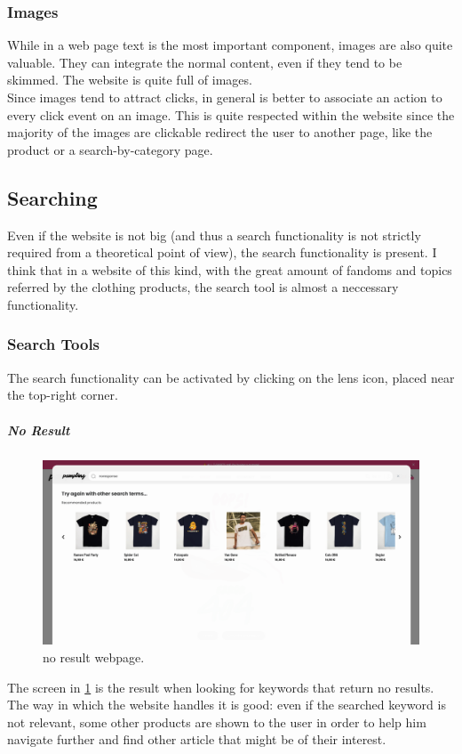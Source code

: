 \subsubsection{Images}
While in a web page text is the most important component, images are also quite valuable. 
They can integrate the normal content, even if they tend to be skimmed.
The website is quite full of images. \\
Since images tend to attract clicks, in general is better to associate an action to every click event on an image.
This is quite respected within the website since the majority of the images are clickable redirect the user to another page, 
like the product or a search-by-category page.

\subsection{Searching}
Even if the website is not big (and thus a search functionality is not strictly required from a theoretical point of view),
the search functionality is present. I think that in a website of this kind, with the great amount of fandoms and topics referred by
the clothing products, the search tool is almost a neccessary functionality. 

\subsubsection{Search Tools}
The search functionality can be activated by clicking on the lens icon, placed near the top-right corner.


\subparagraph{No Result}
\begin{figure}[h!]
	\centering
	\includegraphics[scale=0.225]{images/zero-res.png}
	\caption{no result webpage.}
	\label{fig:zero-res}
\end{figure}

The screen in \cref{fig:zero-res} is the result when looking for keywords that return no results.
The way in which the website handles it is good: even if the searched keyword is not relevant, some other products are shown
to the user in order to help him navigate further and find other article that might be of their interest.

